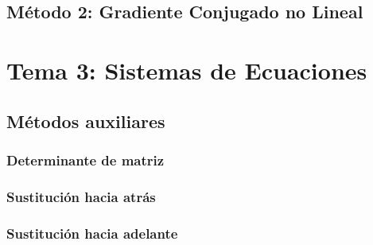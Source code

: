 \documentclass[10pt]{article}
\begin{document}
\subsection{Método 2: Gradiente Conjugado no Lineal}
\UseRawInputEncoding


\newpage

\section{Tema 3: Sistemas de Ecuaciones}

\subsection{Métodos auxiliares}

\subsubsection{Determinante de matriz}

\UseRawInputEncoding


\newpage

\subsubsection{Sustitución hacia atrás}

\UseRawInputEncoding


\newpage

\subsubsection{Sustitución hacia adelante}

\UseRawInputEncoding

\end{document}
